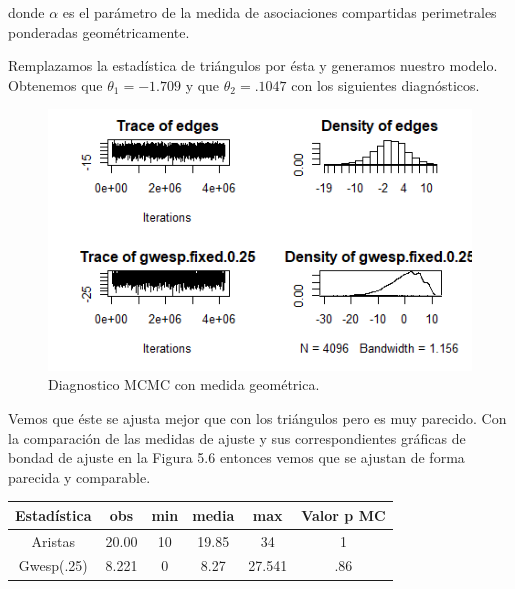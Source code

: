 donde $\alpha$ es el parámetro de la medida de asociaciones compartidas perimetrales ponderadas geométricamente.

Remplazamos la estadística de triángulos por ésta y generamos nuestro modelo. Obtenemos que $\theta_1 = -1.709$ y que $\theta_2 = .1047$ con los siguientes diagnósticos. 

\begin{figure}[h]
\includegraphics[width=1\textwidth]{Tesis/Figures/mcmcgwesp.jpg}
\caption{Diagnostico MCMC con medida geométrica.}
\centering
\end{figure}

Vemos que éste se ajusta mejor que con los triángulos pero es muy parecido. Con la comparación de las medidas de ajuste y sus correspondientes gráficas de bondad de ajuste en la Figura 5.6 entonces vemos que se ajustan de forma parecida y comparable.

\begin{center}
 \begin{tabular}{||c c c c c c||} 
 \hline
 Estadística & obs & min & media & max & Valor p MC \\ [.5ex]
 \hline\hline
 Aristas & 20.00 & 10 & 19.85 & 34 & 1 \\ 
 \hline
 Gwesp(.25) & 8.221 & 0 & 8.27 & 27.541 & .86 \\
 \hline
\end{tabular}
\end{center}



